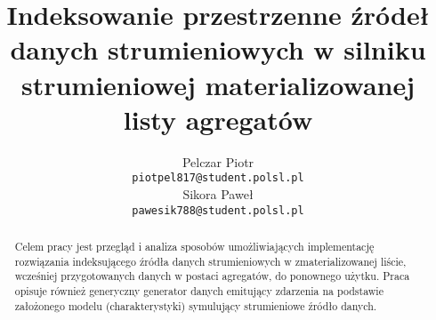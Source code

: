 \documentclass[12pt]{article}
\title{Indeksowanie przestrzenne źródeł danych strumieniowych w silniku strumieniowej materializowanej listy agregatów}
\author{
	  Pelczar Piotr\\
	  \small{\texttt{piotpel817@student.polsl.pl}}
	  \\[3ex]
	  Sikora Paweł\\
	  \small{\texttt{pawesik788@student.polsl.pl}}
	}
\date{\displaydate{date}}
\begin{document}
\maketitle
 
\begin{abstract}
Celem pracy jest przegląd i analiza sposobów umożliwiających implementację rozwiązania indeksującego źródła danych strumieniowych w zmaterializowanej liście, wcześniej przygotowanych danych w postaci agregatów, do ponownego użytku. Praca opisuje również generyczny generator danych emitujący zdarzenia na podstawie założonego modelu (charakterystyki) symulujący strumieniowe źródło danych.
\end{abstract}

\renewcommand{\contentsname}{Contents}

\newpage
\tableofcontents

\newpage










\end{document}
